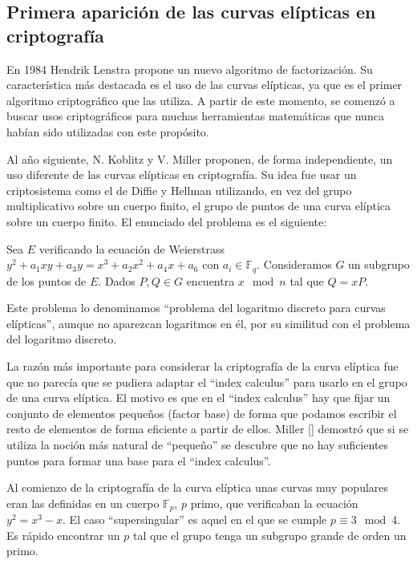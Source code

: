 \documentclass[
  a4paper,
  12pt,
  spanish,
]{scrartcl}
\begin{document}
\subsection{Primera aparición de las curvas elípticas en criptografía}

En 1984 Hendrik Lenstra propone un nuevo algoritmo de factorización. Su característica más destacada es el uso de las curvas elípticas, ya que es el primer algoritmo criptográfico que las utiliza. A partir de este momento, se comenzó a buscar usos criptográficos para muchas herramientas matemáticas que nunca habían sido utilizadas con este propósito.


Al año siguiente, N. Koblitz y V. Miller proponen, de forma independiente, un uso diferente de las curvas elípticas en criptografía. Su idea fue usar un criptosistema como el de Diffie y Hellman utilizando, en vez del grupo multiplicativo sobre un cuerpo finito, el grupo de puntos de una curva elíptica sobre un cuerpo finito. El enunciado del problema es el siguiente:
\begin{displayquote}
  Sea $E$ verificando la ecuación de Weierstrass $y^2+a_1xy+a_3y=x^3+a_2x^2+a_4x+a_6$ con $a_i \in \mathbb{F}_q$. Consideramos $G$ un subgrupo de los puntos de $E$. Dados $P,Q \in G$ encuentra $x \mod{n}$ tal que $Q=xP$. 
\end{displayquote} 
Este problema lo denominamos ``problema del logaritmo discreto para curvas elípticas'', aunque no aparezcan logaritmos en él, por su similitud con el problema del logaritmo discreto.

La razón más importante para considerar la criptografía de la curva elíptica fue que no parecía que se pudiera adaptar el ``index calculus'' para usarlo en el grupo de una curva elíptica. El motivo es que en el ``index calculus'' hay que fijar un conjunto de elementos pequeños (factor base) de forma que podamos escribir el resto de elementos de forma eficiente a partir de ellos. Miller [] demostró que si se utiliza la noción más natural de ``pequeño'' se descubre que no hay suficientes puntos para formar una base para el ``index calculus''.

Al comienzo de la criptografía de la curva elíptica unas curvas muy populares eran las definidas en un cuerpo $\mathbb{F}_p$, $p$ primo, que verificaban la ecuación $y^2 = x^3 - x$. El caso ``supersingular'' es aquel en el que se cumple $p \equiv 3 \mod 4$.  Es rápido encontrar un $p$ tal que el grupo tenga un subgrupo grande de orden un primo.
\end{document}
